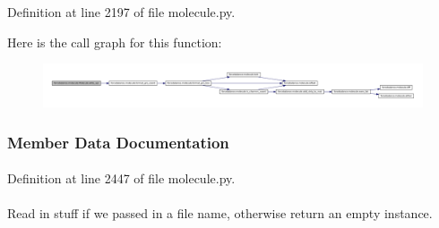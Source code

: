 \-Definition at line 2197 of file molecule.\-py.



\-Here is the call graph for this function\-:
\nopagebreak
\begin{figure}[H]
\begin{center}
\leavevmode
\includegraphics[width=350pt]{classforcebalance_1_1molecule_1_1Molecule_adc6620e8287edabe161442de12295f75_cgraph}
\end{center}
\end{figure}




\subsubsection{\-Member \-Data \-Documentation}
\hypertarget{classforcebalance_1_1molecule_1_1Molecule_ac84c67d37f00c0f65e6fb6126e19f9bb}{
\paragraph[{boxes}]{}}\label{classforcebalance_1_1molecule_1_1Molecule_ac84c67d37f00c0f65e6fb6126e19f9bb}


\-Definition at line 2447 of file molecule.\-py.

\hypertarget{classforcebalance_1_1molecule_1_1Molecule_a5e092c726455a18c9300f5c5362121d8}{
\paragraph[{comms}]{}}\label{classforcebalance_1_1molecule_1_1Molecule_a5e092c726455a18c9300f5c5362121d8}


\-Read in stuff if we passed in a file name, otherwise return an empty instance. 

